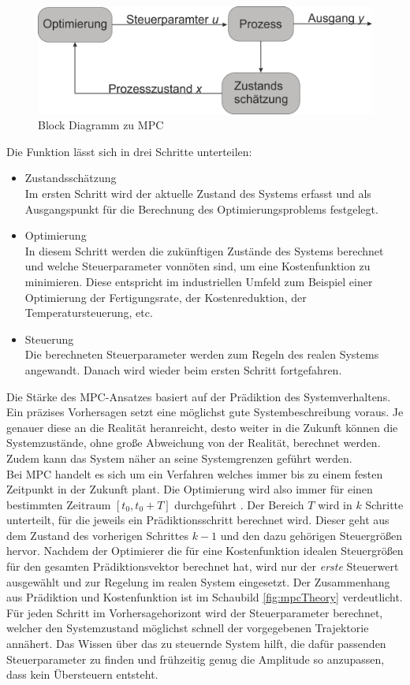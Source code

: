 \documentclass{like}
\begin{document}
  \begin{figure}[ht!]
  	\centering
  	\includegraphics[width=350pt]{Abbildungen/mpcBlockDiagram.png}
  	\caption{Block Diagramm zu MPC}
  	\label{fig:mpcBlock}
  \end{figure}

Die Funktion lässt sich in drei Schritte unterteilen:
\begin{itemize}
	\item Zustandsschätzung \\ Im ersten Schritt wird der aktuelle Zustand des Systems erfasst und als Ausgangspunkt für die Berechnung des Optimierungsproblems festgelegt.
	\item Optimierung \\ In diesem Schritt werden die zukünftigen Zustände des Systems berechnet und welche Steuerparameter vonnöten sind, um eine Kostenfunktion zu minimieren. Diese entspricht im industriellen Umfeld zum Beispiel einer Optimierung der Fertigungsrate, der Kostenreduktion,  der Temperatursteuerung, etc.
	\item Steuerung \\ Die berechneten Steuerparameter werden zum Regeln des realen Systems angewandt. Danach wird wieder beim ersten Schritt fortgefahren.   
\end{itemize}


Die Stärke des \ac{MPC}-Ansatzes basiert auf der Prädiktion des Systemverhaltens. Ein präzises Vorhersagen setzt eine möglichst gute Systembeschreibung voraus. Je genauer diese an die Realität heranreicht, desto weiter in die Zukunft können die Systemzustände, ohne große Abweichung von der Realität, berechnet werden. Zudem kann das System näher an seine Systemgrenzen geführt werden. \\
Bei \ac{MPC} handelt es sich um ein Verfahren welches immer bis zu einem festen Zeitpunkt in der Zukunft plant. Die Optimierung wird also immer für einen bestimmten Zeitraum $ [t_0, t_0 + T] $ durchgeführt . Der Bereich \(T\) wird in \(k\) Schritte unterteilt, für die jeweils ein Prädiktionsschritt berechnet wird. Dieser geht aus dem Zustand des vorherigen Schrittes $k -1$ und den dazu gehörigen Steuergrößen hervor. Nachdem der Optimierer die für eine Kostenfunktion idealen Steuergrößen für den gesamten Prädiktionsvektor berechnet hat, wird nur der \emph{erste} Steuerwert ausgewählt und zur Regelung im realen System eingesetzt. Der Zusammenhang aus Prädiktion und Kostenfunktion ist im Schaubild \ref{fig:mpcTheory} verdeutlicht. Für jeden Schritt im Vorhersagehorizont wird der Steuerparameter berechnet, welcher den Systemzustand möglichst schnell der vorgegebenen Trajektorie annähert. Das Wissen über das zu steuernde System hilft, die dafür passenden Steuerparameter zu finden und frühzeitig genug die Amplitude so anzupassen, dass kein Übersteuern entsteht. 
\end{document}
